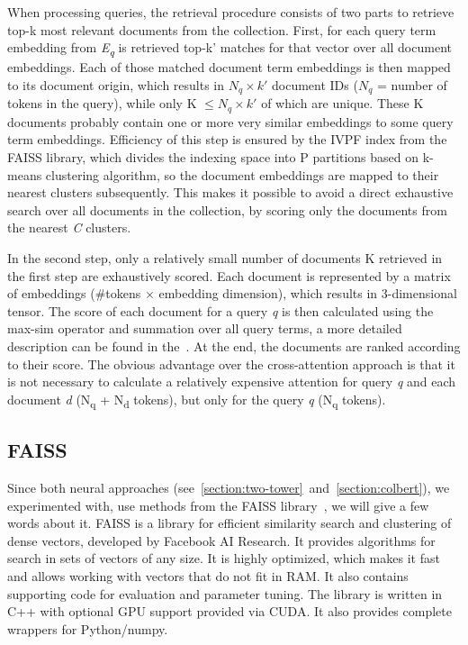     When processing queries, the retrieval procedure consists of two parts to retrieve top-k most relevant documents from the collection. First, for each query term embedding from \emph{E\textsubscript{q}} is retrieved top-k' matches for that vector over all document embeddings. Each of those matched document term embeddings is then mapped to its document origin, which results in $N_{q} \times k'$ document IDs ($N_{q}$ = number of tokens in the query), while only K $\leq N_{q} \times k'$ of which are unique. These K documents probably contain one or more very similar embeddings to some query term embeddings. Efficiency of this step is ensured by the IVPF index from the FAISS library, which divides the indexing space into P partitions based on k-means clustering algorithm, so the document embeddings are mapped to their nearest clusters subsequently. This makes it possible to avoid a direct exhaustive search over all documents in the collection, by scoring only the documents from the nearest \emph{C} clusters.
    
    In the second step, only a relatively small number of documents K retrieved in the first step are exhaustively scored. Each document is represented by a matrix of embeddings (\#tokens $\times$ embedding dimension), which results in 3-dimensional tensor. The score of each document for a query \emph{q} is then calculated using the max-sim operator and summation over all query terms, a more detailed description can be found in the~\parencite{colbert_2020}. At the end, the documents are ranked according to their score. The obvious advantage over the cross-attention approach is that it is not necessary to calculate a relatively expensive attention for query \emph{q} and each document \emph{d} (N\textsubscript{q} + N\textsubscript{d} tokens), but only for the query \emph{q} (N\textsubscript{q} tokens).


\subsection{FAISS}
\label{section:faiss}
    Since both neural approaches (see~\ref{section:two-tower}~and~\ref{section:colbert}), we experimented with, use methods from the FAISS library~\parencite{Johnson_2019_faiss}, we will give a few words about it. FAISS is a library for efficient similarity search and clustering of dense vectors, developed by Facebook AI Research. It provides algorithms for search in sets of vectors of any size. It is highly optimized, which makes it fast and allows working with vectors that do not fit in RAM. It also contains supporting code for evaluation and parameter tuning. The library is written in C++ with optional GPU support provided via CUDA. It also provides complete wrappers for Python/numpy.
    
